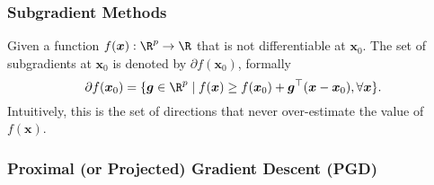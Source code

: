     \subsubsection{Subgradient Methods}
    Given a function $f(\bm{x}): \R^\nfeat \rightarrow \R$ that is not differentiable at $\bm{x}_0$. 
    The set of subgradients at $\bm{x}_0$ is denoted by $\partial f(\bm{x}_0)$, formally
        \begin{equation}
            \partial f(\bm{x}_0) = \Set{\bm{g} \in \R^\nfeat}{f(\bm{x}) \ge f(\bm{x}_0) + \bm{g}^\top (\bm{x} - \bm{x}_0), \forall \bm{x}}.
        \end{equation}
    Intuitively, this is the set of directions that never over-estimate the value of $f(\bm{x})$.
    
    \subsubsection{Proximal (or Projected) Gradient Descent (PGD)}
